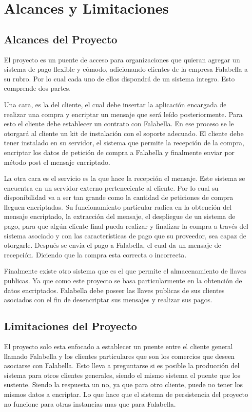 \documentclass[a4paper,12pt,openany,oneside]{book}
\begin{document}
\chapter{Alcances y Limitaciones}
\thispagestyle{empty}
\section{Alcances del Proyecto}
El proyecto es un puente de acceso para organizaciones que quieran agregar un sistema de pago flexible y cómodo, adicionando clientes de la empresa Falabella a su rubro. Por lo cual cada uno de ellos dispondrá de un sistema integro. Esto comprende dos partes.

Una cara, es la del cliente, el cual debe insertar la aplicación encargada de realizar una compra y encriptar un mensaje que será leído posteriormente. Para esto el cliente debe establecer un contrato con Falabella. En ese proceso se le otorgará al cliente un kit de instalación con el soporte adecuado. El cliente debe tener instalado en su servidor, el sistema que permite la recepción de la compra, encriptar los datos de petición de compra a Falabella y finalmente enviar por método post el mensaje encriptado.

La otra cara es el servicio es la que hace la recepción el mensaje. Este sistema se encuentra en un servidor externo perteneciente al cliente. Por lo cual su disponibilidad va a ser tan grande como la cantidad de peticiones de compra lleguen encriptadas. Su funcionamiento particular radica en la obtención del mensaje encriptado, la extracción del mensaje, el despliegue de un sistema de pago, para que algún cliente final pueda realizar y finalizar la compra a través del sistema asociado y con las características de pago que su proveedor, sea capaz de otorgarle. Después se envía el pago a Falabella, el cual da un mensaje de recepción. Diciendo que la compra esta correcta o incorrecta.

Finalmente existe otro sistema que es el que permite el almacenamiento de llaves publicas. Ya que como este proyecto se basa particularmente en la obtención de datos encriptados. Falabella debe poseer las llaves publicas de sus clientes asociados con el fin de desencriptar sus mensajes y realizar sus pagos.
\section{Limitaciones del Proyecto}
El proyecto solo esta enfocado a establecer un puente entre el cliente general llamado Falabella y los clientes particulares que son los comercios que deseen asociarse con  Falabella. Esto lleva a preguntarse si es posible la producción del sistema para otros clientes generales, siendo el mismo sistema el puente que los sustente. Siendo la respuesta un no, ya que para otro cliente, puede no tener los mismos datos a encriptar. Lo que hace que el sistema de persistencia del proyecto no funcione para otras instancias mas que para Falabella.
\end{document}
